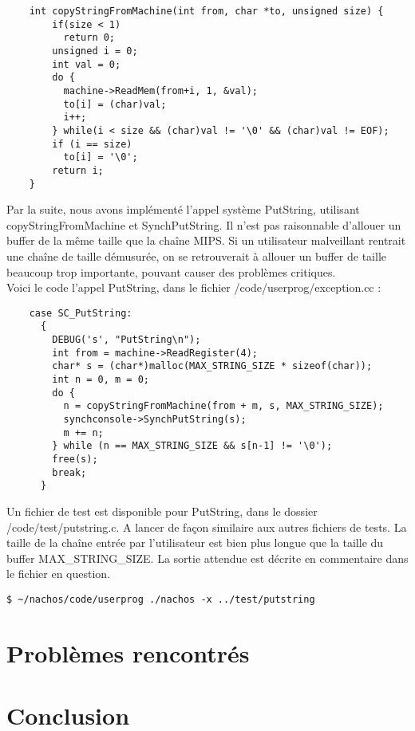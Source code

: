 \documentclass[a4paper]{article}
\begin{document}
\begin{verbatim}
	int copyStringFromMachine(int from, char *to, unsigned size) {
	    if(size < 1)
	      return 0;
	    unsigned i = 0;
	    int val = 0;
	    do {
	      machine->ReadMem(from+i, 1, &val);
	      to[i] = (char)val;
	      i++;
	    } while(i < size && (char)val != '\0' && (char)val != EOF);
	    if (i == size)
	      to[i] = '\0';
	    return i;
	}
\end{verbatim}

Par la suite, nous avons implémenté l'appel système PutString, utilisant
copyStringFromMachine et SynchPutString. Il n'est pas raisonnable d'allouer un
buffer de la même taille que la chaîne MIPS. Si un utilisateur malveillant
rentrait une chaîne de taille démusurée, on se retrouverait à allouer un buffer
de taille beaucoup trop importante, pouvant causer des problèmes critiques. \\
Voici le code l'appel PutString, dans le fichier /code/userprog/exception.cc :

\begin{verbatim}
	case SC_PutString:
	  {
		DEBUG('s', "PutString\n");
		int from = machine->ReadRegister(4);
		char* s = (char*)malloc(MAX_STRING_SIZE * sizeof(char));
		int n = 0, m = 0;
		do {
		  n = copyStringFromMachine(from + m, s, MAX_STRING_SIZE);
		  synchconsole->SynchPutString(s);
		  m += n;
		} while (n == MAX_STRING_SIZE && s[n-1] != '\0');
		free(s);
		break;
	  }
\end{verbatim}

Un fichier de test est disponible pour PutString, dans le dossier /code/test/putstring.c.
A lancer de façon similaire aux autres fichiers de tests. La taille de la chaîne
entrée par l'utilisateur est bien plus longue que la taille du buffer MAX\_STRING\_SIZE.
La sortie attendue est décrite en commentaire dans le fichier en question.
\begin{verbatim}
$ ~/nachos/code/userprog ./nachos -x ../test/putstring
\end{verbatim}


\newpage
\section{Problèmes rencontrés}


\section{Conclusion}

\end{document}
